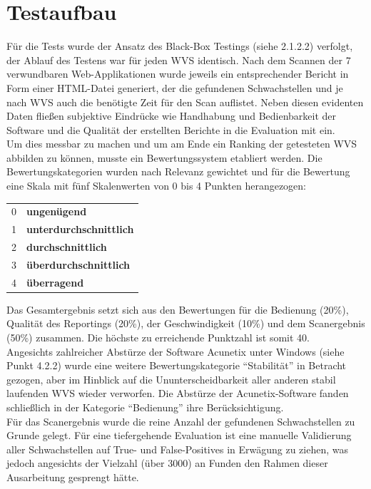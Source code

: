 \documentclass[12pt,oneside,a4paper,parskip]{scrbook}
\begin{document}
  \section{Testaufbau}
  Für die Tests wurde der Ansatz des Black-Box Testings (siehe 2.1.2.2) verfolgt, der Ablauf des Testens war für jeden WVS identisch.
  Nach dem Scannen der 7 verwundbaren Web-Applikationen wurde jeweils ein entsprechender Bericht in Form einer HTML-Datei generiert, der die gefundenen Schwachstellen und je nach WVS auch die benötigte Zeit für den Scan auflistet.
  Neben diesen evidenten Daten fließen subjektive Eindrücke wie Handhabung und Bedienbarkeit der Software und die Qualität der erstellten Berichte in die Evaluation mit ein.\\
  Um dies messbar zu machen und um am Ende ein Ranking der getesteten WVS abbilden zu können, musste ein Bewertungssystem etabliert werden. Die Bewertungskategorien wurden nach Relevanz gewichtet und für die Bewertung eine Skala mit fünf Skalenwerten von 0 bis 4 Punkten herangezogen:
  \begin{table}[H]
     \begin{tabular}{ll}
     0         & \textbf{ungenügend}             \\
     1         & \textbf{unterdurchschnittlich}  \\
     2         & \textbf{durchschnittlich}       \\
     3         & \textbf{überdurchschnittlich}   \\
     4         & \textbf{überragend}
     \end{tabular}
   \end{table}
   Das Gesamtergebnis setzt sich aus den Bewertungen für die Bedienung (20\%), Qualität des Reportings (20\%), der Geschwindigkeit (10\%) und dem Scanergebnis (50\%) zusammen. Die höchste zu erreichende Punktzahl ist somit 40.\\
   Angesichts zahlreicher Abstürze der Software Acunetix unter Windows (siehe Punkt 4.2.2) wurde eine weitere Bewertungskategorie ``Stabilität'' in Betracht gezogen, aber im Hinblick auf die Ununterscheidbarkeit aller anderen stabil laufenden WVS wieder verworfen. Die Abstürze der Acunetix-Software fanden schließlich in der Kategorie ``Bedienung'' ihre Berücksichtigung.\\
   Für das Scanergebnis wurde die reine Anzahl der gefundenen Schwachstellen zu Grunde gelegt. Für eine tiefergehende Evaluation ist eine manuelle Validierung aller Schwachstellen auf True- und False-Positives in Erwägung zu ziehen, was jedoch angesichts der Vielzahl (über 3000) an Funden den Rahmen dieser Ausarbeitung gesprengt hätte.
\end{document}
